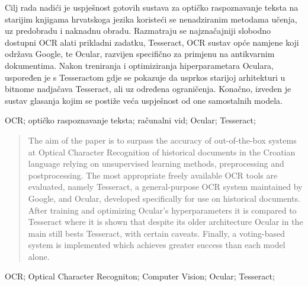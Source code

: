 \documentclass[zavrsnirad]{fer}
\begin{document}

\begin{sazetak}
  Cilj rada nadići je uspješnost gotovih sustava za optičko raspoznavanje teksta na starijim knjigama hrvatskoga jezika koristeći se nenadziranim metodama učenja, uz predobradu i naknadnu obradu. Razmatraju se najznačajniji slobodno dostupni OCR alati prikladni zadatku, Tesseract, OCR sustav opće namjene koji održava Google, te Ocular, razvijen specifično za primjenu na antikvarnim dokumentima. Nakon treniranja i optimiziranja hiperparametara Oculara, uspoređen je s Tesseractom gdje se pokazuje da usprkos starijoj arhitekturi u bitnome nadjačava Tesseract, ali uz određena ograničenja. Konačno, izveden je sustav glasanja kojim se postiže veća uspješnost od one samostalnih modela.
\end{sazetak}

\begin{kljucnerijeci}
  OCR; optičko raspoznavanje teksta; računalni vid; Ocular; Tesseract;
\end{kljucnerijeci}


\begin{abstract}
  The aim of the paper is to surpass the accuracy of out-of-the-box systems at Optical Character Recognition of historical documents in the Croatian language relying on unsupervised learning methods, preprocessing and postprocessing. The most appropriate freely available OCR tools are evaluated, namely Tesseract, a general-purpose OCR system maintained by Google, and Ocular, developed specifically for use on historical documents. After training and optimizing Ocular's hyperparameters it is compared to Tesseract where it is shown that despite its older architecture Ocular in the main still bests Tesseract, with certain caveats. Finally, a voting-based system is implemented which achieves greater success than each model alone.
\end{abstract}

\begin{keywords}
  OCR; Optical Character Recogniton; Computer Vision; Ocular; Tesseract;
\end{keywords}



\backmatter
\end{document}
